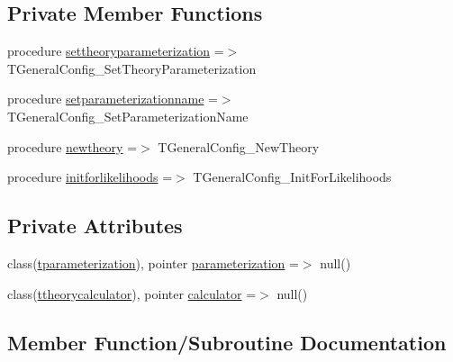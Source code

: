 \subsection*{Private Member Functions}
\begin{DoxyCompactItemize}
\item 
procedure \mbox{\hyperlink{structgeneraltypes_1_1tgeneralconfig_aa478d44e92a9b735e4a3e5d4c962f691}{settheoryparameterization}} =$>$ T\+General\+Config\+\_\+\+Set\+Theory\+Parameterization
\item 
procedure \mbox{\hyperlink{structgeneraltypes_1_1tgeneralconfig_ac5eaf5ec29f4010bc5ac2d077962ab37}{setparameterizationname}} =$>$ T\+General\+Config\+\_\+\+Set\+Parameterization\+Name
\item 
procedure \mbox{\hyperlink{structgeneraltypes_1_1tgeneralconfig_a440c4faad8855f8a9d3925bb09dc9935}{newtheory}} =$>$ T\+General\+Config\+\_\+\+New\+Theory
\item 
procedure \mbox{\hyperlink{structgeneraltypes_1_1tgeneralconfig_a8eef3e81aafa8e62fe4e6c35c01d68cb}{initforlikelihoods}} =$>$ T\+General\+Config\+\_\+\+Init\+For\+Likelihoods
\end{DoxyCompactItemize}
\subsection*{Private Attributes}
\begin{DoxyCompactItemize}
\item 
class(\mbox{\hyperlink{structgeneraltypes_1_1tparameterization}{tparameterization}}), pointer \mbox{\hyperlink{structgeneraltypes_1_1tgeneralconfig_ac874e0a61802f5a8c144aa7318ec4c41}{parameterization}} =$>$ null()
\item 
class(\mbox{\hyperlink{structgeneraltypes_1_1ttheorycalculator}{ttheorycalculator}}), pointer \mbox{\hyperlink{structgeneraltypes_1_1tgeneralconfig_a6510b28d396a0023fee064c386457f81}{calculator}} =$>$ null()
\end{DoxyCompactItemize}


\subsection{Member Function/\+Subroutine Documentation}
\mbox{\label{structgeneraltypes_1_1tgeneralconfig_a8eef3e81aafa8e62fe4e6c35c01d68cb}} 
